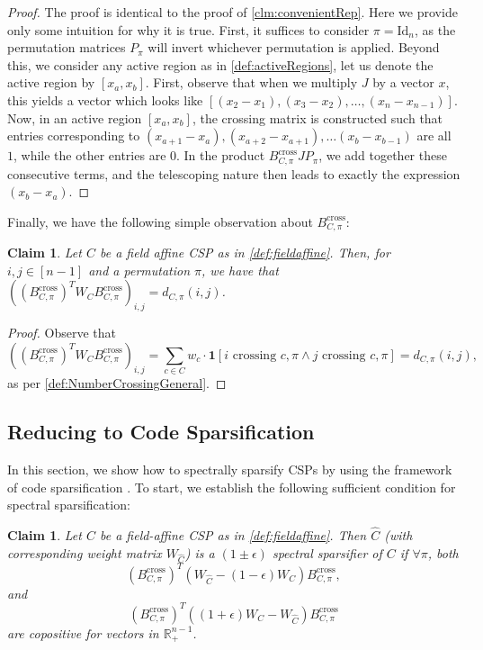 \documentclass[11pt]{article}
\newtheorem{claim}[theorem]{Claim}
\theoremstyle{definition}
\newcommand{\R}{\mathbb{R}}
\newcommand{\eps}{\epsilon}
\begin{document}
\begin{proof}
	The proof is identical to the proof of \cref{clm:convenientRep}. Here we provide only some intuition for why it is true. First, it suffices to consider $\pi = \mathrm{Id}_n$, as the permutation matrices $P_{\pi}$ will invert whichever permutation is applied. Beyond this, we consider any active region as in \cref{def:activeRegions}, let us denote the active region by $[x_a, x_b]$. First, observe that when we multiply $J$ by a vector $x$, this yields a vector which looks like $[(x_2 - x_1), (x_3 - x_2), \dots, (x_n - x_{n-1})]$. Now, in an active region $[x_a, x_b]$, the crossing matrix is constructed such that entries corresponding to $(x_{a+1}-  x_a), (x_{a+2} - x_{a+1}), \dots (x_b - x_{b-1})$ are all $1$, while the other entries are $0$. In the product $B^{\text{cross}}_{C, \pi} J P_{\pi}$, we add together these consecutive terms, and the telescoping nature then leads to exactly the expression $(x_b - x_a)$.
\end{proof}

Finally, we have the following simple observation about $B^{\text{cross}}_{C, \pi}$:

\begin{claim}\label{clm:crossingNumberCrossingMatrixGeneral}
	Let $C$ be a field affine CSP as in  \cref{def:fieldaffine}. Then, for $i, j \in [n-1]$ and a permutation $\pi$, we have that $((B^{\text{cross}}_{C, \pi})^T W_C B^{\text{cross}}_{C, \pi})_{i,j} = d_{C, \pi}(i,j)$.
\end{claim}

\begin{proof}
	Observe that 
	\[
	((B^{\text{cross}}_{C, \pi})^T W_C B^{\text{cross}}_{C, \pi})_{i,j} = \sum_{c \in C} w_c \cdot \mathbf{1}[i \text{ crossing } c,\pi \wedge j \text{ crossing } c,\pi] = d_{C, \pi}(i,j),
	\]
    as per \cref{def:NumberCrossingGeneral}.
\end{proof}

\subsection{Reducing to Code Sparsification}

In this section, we show how to spectrally sparsify CSPs by using the framework of code sparsification \cite{KPS24, KPS24c}. To start, we establish the following sufficient condition for spectral sparsification:

\begin{claim}\label{clm:copositiveMatrixGeneral}
	Let $C$ be a field-affine CSP as in \cref{def:fieldaffine}. Then $\hat{C}$ (with corresponding weight matrix $W_{\hat{C}}$) is a $(1 \pm \eps)$ spectral sparsifier of $C$ if $\forall \pi$, both
	\[
	(B^{\text{cross}}_{C, \pi})^T (W_{\hat{C}} - (1 - \eps)W_C) B^{\text{cross}}_{C, \pi},
	\]
	and 
	\[
	(B^{\text{cross}}_{C, \pi})^T ((1 + \eps)W_C - W_{\hat{C}} ) B^{\text{cross}}_{C, \pi} 
	\]
	are copositive for vectors in $\R^{n-1}_+$.
\end{claim}
\end{document}
